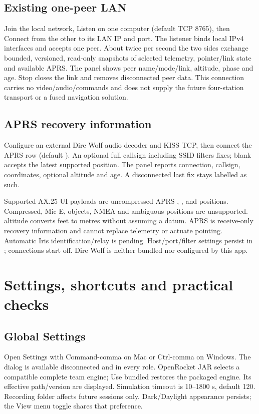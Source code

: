\subsection{Existing one-peer LAN}
Join the local network, Listen on one computer (default TCP 8765), then Connect
from the other to its LAN IP and port. The listener binds local IPv4 interfaces
and accepts one peer. About twice per second the two sides exchange bounded,
versioned, read-only snapshots of selected telemetry, pointer/link state and
available APRS. The panel shows peer name/mode/link, altitude, phase and age.
Stop closes the link and removes disconnected peer data. This connection
carries no video/audio/commands and does not supply the future four-station
transport or a fused navigation solution.

\subsection{APRS recovery information}
Configure an external Dire Wolf audio decoder and KISS TCP, then connect the
APRS row (default ). An optional full callsign including
SSID filters fixes; blank accepts the latest supported position. The panel
reports connection, callsign, coordinates, optional altitude and age. A
disconnected last fix stays labelled as such.

Supported AX.25 UI payloads are uncompressed APRS \code{!}, \code{=},
\code{/} and  positions. Compressed, Mic-E, objects, NMEA and ambiguous
positions are unsupported.  altitude converts feet to metres without
assuming a datum. APRS is receive-only recovery information and cannot replace
telemetry or actuate pointing. Automatic Iris identification/relay is pending.
Host/port/filter settings persist in ; connections
start off. Dire Wolf is neither bundled nor configured by this app.

\section{Settings, shortcuts and practical checks}\label{sec:settings}
\subsection{Global Settings}
Open Settings with Command-comma on Mac or Ctrl-comma on Windows. The dialog is
available disconnected and in every role. OpenRocket JAR selects a compatible
complete team engine; Use bundled restores the packaged engine. Its effective
path/version are displayed. Simulation timeout is 10--1800 s, default 120.
Recording folder affects future sessions only. Dark/Daylight appearance
persists; the View menu toggle shares that preference.

